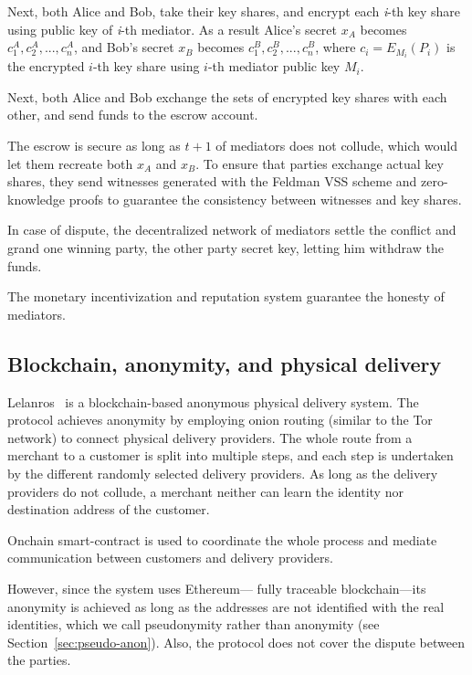 \documentclass{ieeeaccess}
\begin{document}
Next, both Alice and Bob, take their key shares, and encrypt each
\textit{i}-th key share using public key of \textit{i}-th mediator. As a result
Alice's secret \(x_A\) becomes \({c^A_1, c^A_2,...,c^A_n}\), and Bob's
secret \(x_B\) becomes \({c^B_1, c^B_2,...,c^B_n}\), where
\(c_i = E_{M_i}(P_i)\) is the encrypted \(i\)-th key share using
\(i\)-th mediator public key \(M_i\).

Next, both Alice and Bob exchange the sets of encrypted key shares with
each other, and send funds to the escrow account.

The escrow is secure as long as \(t+1\) of mediators does not collude,
which would let them recreate both \(x_A\) and \(x_B\). To ensure
that parties exchange actual key shares, they send witnesses
generated with the Feldman VSS scheme and zero-knowledge proofs to guarantee the consistency between witnesses and key shares.

In case of dispute, the decentralized network of mediators settle the
conflict and grand one winning party, the other party secret key,
letting him withdraw the funds.

The monetary incentivization and reputation system guarantee the honesty of mediators.

\subsection{Blockchain, anonymity, and physical delivery}\label{lelantos-a-blockchain-based-anonymous-physical-delivery-system}

Lelanros~\cite{altawy2017lelantos} is a blockchain-based anonymous
physical delivery system. The protocol achieves anonymity by employing onion routing (similar to the Tor network) to connect physical delivery providers. The whole route from a merchant to a customer is split into multiple steps, and each step is undertaken by the different randomly selected delivery providers. As long as the delivery providers do not collude, a merchant neither can learn the identity nor destination address of the customer.

Onchain smart-contract is used to coordinate the whole process and
mediate communication between customers and delivery providers.

However, since the system uses Ethereum— fully traceable blockchain—its anonymity is achieved as long as the addresses are not identified with the real identities, which we call pseudonymity rather than anonymity (see Section~\ref{sec:pseudo-anon}). Also, the protocol does not cover the dispute between the parties.
 
\end{document}
